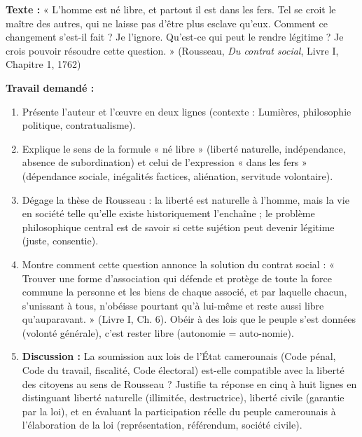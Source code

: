 \documentclass[11pt]{article}
\newcommand{\cle}[1]{{\popxbold\color{popdark}#1}}
\begin{document}
\begin{exercice}
\textbf{Texte :} « L'homme est né libre, et partout il est dans les fers. Tel se croit le maître des autres, qui ne laisse pas d'être plus esclave qu'eux. Comment ce changement s'est-il fait ? Je l'ignore. Qu'est-ce qui peut le rendre légitime ? Je crois pouvoir résoudre cette question. » (Rousseau, \emph{Du contrat social}, Livre I, Chapitre 1, 1762)

\textbf{Travail demandé :}
\begin{enumerate}
\item Présente l'auteur et l'œuvre en deux lignes (contexte : Lumières, philosophie politique, contratualisme).
\item Explique le sens de la formule « né libre » (liberté naturelle, indépendance, absence de subordination) et celui de l'expression « dans les fers » (dépendance sociale, inégalités factices, aliénation, servitude volontaire).
\item Dégage la thèse de Rousseau : la liberté est naturelle à l'homme, mais la vie en société telle qu'elle existe historiquement l'enchaîne ; le problème philosophique central est de savoir si cette sujétion peut devenir \cle{légitime} (juste, consentie).
\item Montre comment cette question annonce la solution du \cle{contrat social} : « Trouver une forme d'association qui défende et protège de toute la force commune la personne et les biens de chaque associé, et par laquelle chacun, s'unissant à tous, n'obéisse pourtant qu'à lui-même et reste aussi libre qu'auparavant. » (Livre I, Ch. 6). Obéir à des lois que le peuple s'est données (volonté générale), c'est rester libre (autonomie = auto-nomie).
\item \textbf{Discussion :} La soumission aux lois de l'État camerounais (Code pénal, Code du travail, fiscalité, Code électoral) est-elle compatible avec la liberté des citoyens au sens de Rousseau ? Justifie ta réponse en cinq à huit lignes en distinguant \cle{liberté naturelle} (illimitée, destructrice), \cle{liberté civile} (garantie par la loi), et en évaluant la participation réelle du peuple camerounais à l'élaboration de la loi (représentation, référendum, société civile).
\end{enumerate}
\end{exercice}
\end{document}
